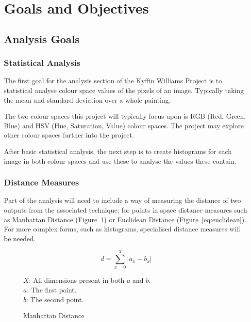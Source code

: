 \documentclass[11pt,fleqn,twoside]{article}
\begin{document}
\section{Goals and Objectives}

\subsection{Analysis Goals}

\subsubsection{Statistical Analysis}
The first goal for the analysis section of the Kyffin Williams Project is to statistical analyse
colour space values of the pixels of an image. Typically taking the mean and standard deviation
over a whole painting.

The two colour spaces this project will typically focus upon is RGB (Red, Green, Blue) and HSV
(Hue, Saturation, Value) colour spaces. The project may explore other colour spaces further into 
the project.

After basic statistical analysis, the next step is to create histograms for each image in both 
colour spaces and use these to analyse the values these contain.

\subsubsection{Distance Measures}
Part of the analysis will need to include a way of measuring the distance of two outputs from the
associated technique; for points in space distance measures such as Manhattan Distance 
(Figure~\ref{eq:manhattan}) or Euclidean Distance (Figure~\ref{eq:euclidean}). For more complex
forms, such as histograms, specialised distance measures will be needed.

\begin{figure}[p]
\[
d = \sum^X_{x=0}{|a_x - b_x|}
\]

\(X\): All dimensions present in both \(a\) and \(b\).\\
\(a\): The first point.\\
\(b\): The second point.

\caption{Manhattan Distance}
\label{eq:manhattan}
\end{figure}
\end{document}

